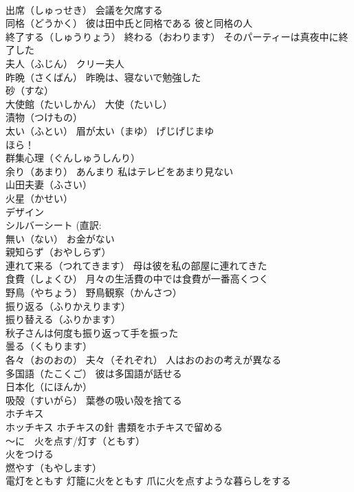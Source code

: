 \documentclass[8pt]{extreport}
\begin{document}
\begin{CJK}{UTF8}{min}
\\	出席（しゅっせき） 会議を欠席する
\\	同格（どうかく） 彼は田中氏と同格である 彼と同格の人
\\	終了する（しゅうりょう） 終わる（おわります） そのパーティーは真夜中に終了した
\\	夫人（ふじん） クリー夫人
\\	昨晩（さくばん） 昨晩は、寝ないで勉強した
\\	砂（すな）
\\	大使館（たいしかん） 大使（たいし）
\\	漬物（つけもの）
\\	太い（ふとい） 眉が太い（まゆ） げじげじまゆ 
\\	ほら！
\\	群集心理（ぐんしゅうしんり）
\\	余り（あまり） あんまり 私はテレビをあまり見ない
\\	山田夫妻（ふさい）
\\	火星（かせい）
\\	デザイン
\\	シルバーシート (直訳: 
\\	無い（ない） お金がない
\\	親知らず（おやしらず）
\\	連れて来る（つれてきます） 母は彼を私の部屋に連れてきた
\\	食費（しょくひ） 月々の生活費の中では食費が一番高くつく
\\	野鳥（やちょう） 野鳥観察（かんさつ）
\\	振り返る（ふりかえります） 
\\	振り替える（ふりかます） 
\\	秋子さんは何度も振り返って手を振った
\\	曇る（くもります）
\\	各々（おのおの） 夫々（それぞれ） 人はおのおの考えが異なる
\\	多国語（たこくご） 彼は多国語が話せる
\\	日本化（にほんか）
\\	吸殻（すいがら） 葉巻の吸い殻を捨てる
\\	ホチキス 
\\	ホッチキス ホチキスの針 書類をホチキスで留める
\\	～に　火を点す/灯す（ともす）
\\	火をつける　
\\	燃やす（もやします）　
\\	電灯をともす 灯籠に火をともす 爪に火を点すような暮らしをする

\end{CJK}
\end{document}
